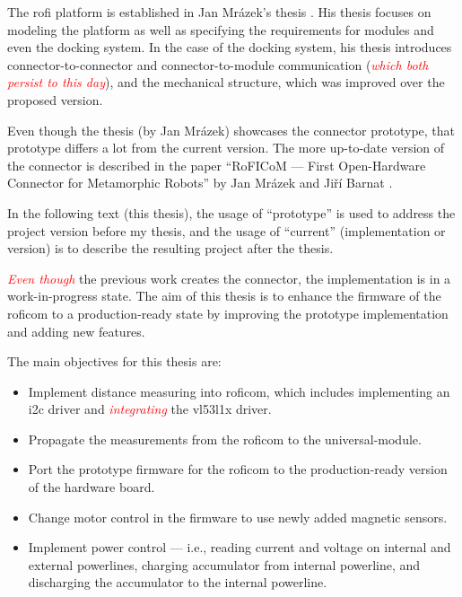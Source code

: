 \documentclass[
  digital,     %
  oneside,     %
  nosansbold,  %
  nocolorbold, %
  nolof,         %
  nolot,         %
]{fithesis4}
\newcommand{\TODO}[1]{\textcolor{red}{\textit{#1}}}
\begin{document}
The \acrshort{rofi} platform is established in Jan Mrázek's thesis \cite{Mrazek2019thesis}. His thesis focuses on modeling the platform as well as specifying the requirements for modules and even the docking system. In the case of the docking system, his thesis introduces connector-to-connector and connector-to-module communication (\TODO{which both persist to this day}), and the mechanical structure, which was improved over the proposed version.

Even though the thesis (by Jan Mrázek) showcases the connector prototype, that prototype differs a lot from the current version. The more up-to-date version of the connector is described in the paper ``RoFICoM --- First Open-Hardware Connector for Metamorphic Robots'' by Jan Mrázek and Jiří Barnat \cite{MrazekBarnat2019Roficom}.

In the following text (this thesis), the usage of ``prototype'' is used to address the project version before my thesis, and the usage of ``current'' (implementation or version) is to describe the resulting project after the thesis.

\TODO{Even though} the previous work creates the connector, the implementation is in a work-in-progress state. The aim of this thesis is to enhance the firmware of the \acrshort{roficom} to a production-ready state by improving the prototype implementation and adding new features.

The main objectives for this thesis are:
\begin{itemize}
    \item Implement distance measuring into \acrshort{roficom}, which includes implementing an \acrshort{i2c} driver and \TODO{integrating} the \gls{vl53l1x} driver.
    \item Propagate the measurements from the \acrshort{roficom} to the \gls{universal-module}. 
    \item Port the prototype firmware for the \acrshort{roficom} to the production-ready version of the hardware board.
    \item Change motor control in the firmware to use newly added magnetic sensors.
    \item Implement power control --- i.e., reading current and voltage on internal and external powerlines, charging accumulator from internal powerline, and discharging the accumulator to the internal powerline.
\end{itemize}
\end{document}
